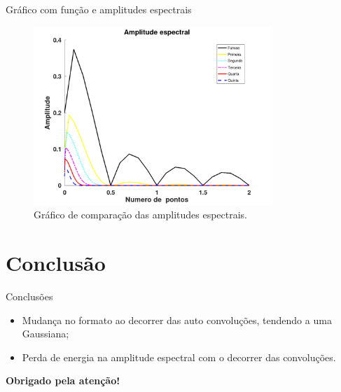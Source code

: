 \documentclass{beamer}
\begin{document}
\begin{frame}{Gráfico com função e amplitudes espectrais}
\begin{figure}[htb]
	\centering
	\includegraphics[width=9cm]{espectral}
	\caption{Gráfico de comparação das amplitudes espectrais.}
\end{figure}	
\end{frame}

\section{Conclusão}

\begin{frame}{Conclusões}
\begin{itemize}
	\item Mudança no formato ao decorrer das auto convoluções, tendendo a uma Gaussiana;
	\item Perda de energia na amplitude espectral com o decorrer das convoluções.
\end{itemize}	
\end{frame}

\begin{frame}
	\begin{center}
		\textbf{{\large Obrigado pela atenção!}}
	\end{center}
	
\end{frame}
\end{document}
